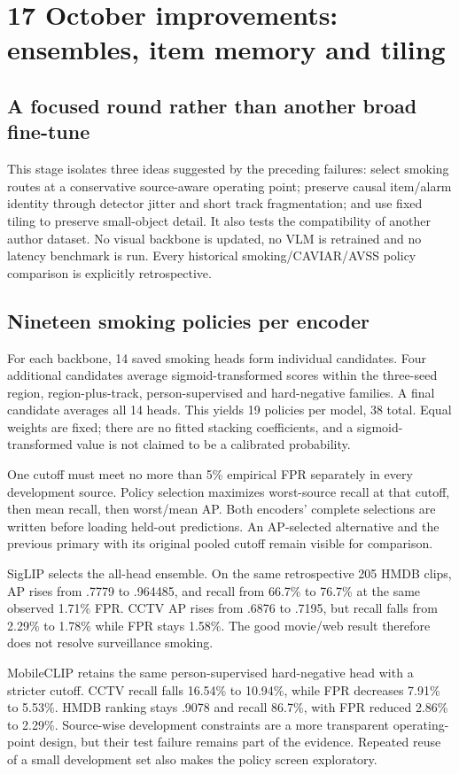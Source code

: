 \chapter{17 October improvements: ensembles, item memory and tiling}
\label{ch:latest}
\section{A focused round rather than another broad fine-tune}
This stage isolates three ideas suggested by the preceding failures: select smoking routes at a conservative source-aware operating point; preserve causal item/alarm identity through detector jitter and short track fragmentation; and use fixed tiling to preserve small-object detail. It also tests the compatibility of another author dataset. No visual backbone is updated, no VLM is retrained and no latency benchmark is run. Every historical smoking/CAVIAR/AVSS policy comparison is explicitly retrospective.

\section{Nineteen smoking policies per encoder}
For each backbone, 14 saved smoking heads form individual candidates. Four additional candidates average sigmoid-transformed scores within the three-seed region, region-plus-track, person-supervised and hard-negative families. A final candidate averages all 14 heads. This yields 19 policies per model, 38 total. Equal weights are fixed; there are no fitted stacking coefficients, and a sigmoid-transformed value is not claimed to be a calibrated probability.

One cutoff must meet no more than 5\% empirical FPR separately in every development source. Policy selection maximizes worst-source recall at that cutoff, then mean recall, then worst/mean AP. Both encoders' complete selections are written before loading held-out predictions. An AP-selected alternative and the previous primary with its original pooled cutoff remain visible for comparison.

SigLIP selects the all-head ensemble. On the same retrospective 205 HMDB clips, AP rises from .7779 to .964485, and recall from 66.7\% to 76.7\% at the same observed 1.71\% FPR. CCTV AP rises from .6876 to .7195, but recall falls from 2.29\% to 1.78\% while FPR stays 1.58\%. The good movie/web result therefore does not resolve surveillance smoking.

MobileCLIP retains the same person-supervised hard-negative head with a stricter cutoff. CCTV recall falls 16.54\% to 10.94\%, while FPR decreases 7.91\% to 5.53\%. HMDB ranking stays .9078 and recall 86.7\%, with FPR reduced 2.86\% to 2.29\%. Source-wise development constraints are a more transparent operating-point design, but their test failure remains part of the evidence. Repeated reuse of a small development set also makes the policy screen exploratory.

